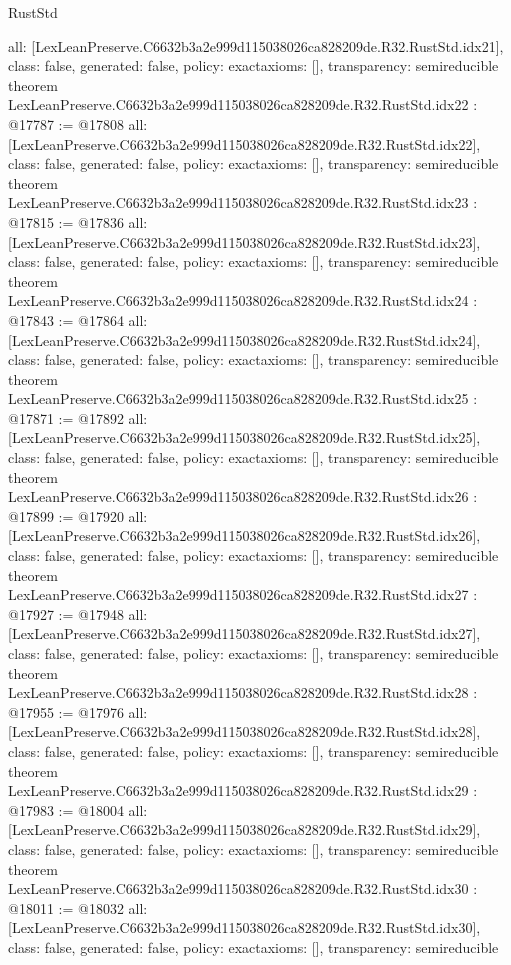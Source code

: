 \begin{lexlean}{RustStd}
\begin{coremodule}
{  all: [LexLeanPreserve.C6632b3a2e999d115038026ca828209de.R32.RustStd.idx21],
  class: false,
  generated: false,
  policy: exact{axioms: []},
  transparency: semireducible
}
theorem LexLeanPreserve.C6632b3a2e999d115038026ca828209de.R32.RustStd.idx22 : @17787 := @17808 {
  all: [LexLeanPreserve.C6632b3a2e999d115038026ca828209de.R32.RustStd.idx22],
  class: false,
  generated: false,
  policy: exact{axioms: []},
  transparency: semireducible
}
theorem LexLeanPreserve.C6632b3a2e999d115038026ca828209de.R32.RustStd.idx23 : @17815 := @17836 {
  all: [LexLeanPreserve.C6632b3a2e999d115038026ca828209de.R32.RustStd.idx23],
  class: false,
  generated: false,
  policy: exact{axioms: []},
  transparency: semireducible
}
theorem LexLeanPreserve.C6632b3a2e999d115038026ca828209de.R32.RustStd.idx24 : @17843 := @17864 {
  all: [LexLeanPreserve.C6632b3a2e999d115038026ca828209de.R32.RustStd.idx24],
  class: false,
  generated: false,
  policy: exact{axioms: []},
  transparency: semireducible
}
theorem LexLeanPreserve.C6632b3a2e999d115038026ca828209de.R32.RustStd.idx25 : @17871 := @17892 {
  all: [LexLeanPreserve.C6632b3a2e999d115038026ca828209de.R32.RustStd.idx25],
  class: false,
  generated: false,
  policy: exact{axioms: []},
  transparency: semireducible
}
theorem LexLeanPreserve.C6632b3a2e999d115038026ca828209de.R32.RustStd.idx26 : @17899 := @17920 {
  all: [LexLeanPreserve.C6632b3a2e999d115038026ca828209de.R32.RustStd.idx26],
  class: false,
  generated: false,
  policy: exact{axioms: []},
  transparency: semireducible
}
theorem LexLeanPreserve.C6632b3a2e999d115038026ca828209de.R32.RustStd.idx27 : @17927 := @17948 {
  all: [LexLeanPreserve.C6632b3a2e999d115038026ca828209de.R32.RustStd.idx27],
  class: false,
  generated: false,
  policy: exact{axioms: []},
  transparency: semireducible
}
theorem LexLeanPreserve.C6632b3a2e999d115038026ca828209de.R32.RustStd.idx28 : @17955 := @17976 {
  all: [LexLeanPreserve.C6632b3a2e999d115038026ca828209de.R32.RustStd.idx28],
  class: false,
  generated: false,
  policy: exact{axioms: []},
  transparency: semireducible
}
theorem LexLeanPreserve.C6632b3a2e999d115038026ca828209de.R32.RustStd.idx29 : @17983 := @18004 {
  all: [LexLeanPreserve.C6632b3a2e999d115038026ca828209de.R32.RustStd.idx29],
  class: false,
  generated: false,
  policy: exact{axioms: []},
  transparency: semireducible
}
theorem LexLeanPreserve.C6632b3a2e999d115038026ca828209de.R32.RustStd.idx30 : @18011 := @18032 {
  all: [LexLeanPreserve.C6632b3a2e999d115038026ca828209de.R32.RustStd.idx30],
  class: false,
  generated: false,
  policy: exact{axioms: []},
  transparency: semireducible
}
\end{coremodule}
\end{lexlean}
